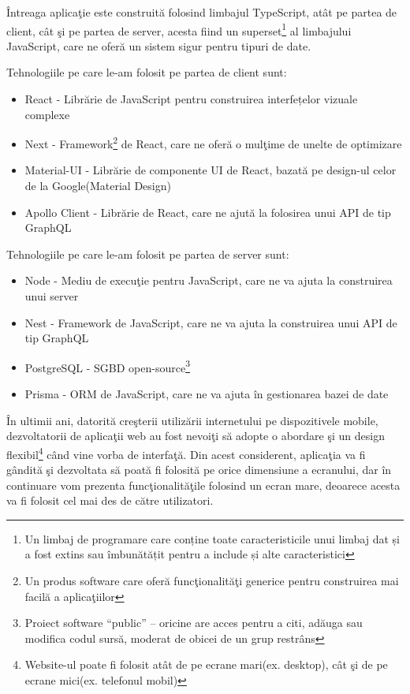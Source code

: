 \documentclass[12pt, a4paper, oneside, romanian]{teza-upb}
\begin{document}
Întreaga aplicaţie este construită folosind limbajul TypeScript, atât pe partea de client, cât şi pe partea de server, acesta fiind un superset\footnote{Un limbaj de programare care conține toate caracteristicile unui limbaj dat și a fost extins sau îmbunătățit pentru a include și alte caracteristici} al limbajului JavaScript, care ne oferă un sistem sigur pentru tipuri de date.

Tehnologiile pe care le-am folosit pe partea de client sunt:
\begin{itemize}
	\item React - Librărie de JavaScript pentru construirea interfețelor vizuale complexe
	\item Next - Framework\footnote{Un produs software care oferă funcţionalităţi generice pentru construirea mai facilă a aplicaţiilor} de React, care ne oferă o mulţime de unelte de optimizare
	\item Material-UI - Librărie de componente UI de React, bazată pe design-ul celor de la Google(Material Design)
	\item Apollo Client - Librărie de React, care ne ajută la folosirea unui API de tip GraphQL
\end{itemize}

Tehnologiile pe care le-am folosit pe partea de server sunt:
\begin{itemize}
	\item Node - Mediu de execuţie pentru JavaScript, care ne va ajuta la construirea unui server
	\item Nest - Framework de JavaScript, care ne va ajuta la construirea unui API de tip GraphQL
	\item PostgreSQL - SGBD open-source\footnote{Proiect software ``public'' -- oricine are acces pentru a citi, adăuga sau modifica codul sursă, moderat de obicei de un grup restrâns}
	\item Prisma - ORM de JavaScript, care ne va ajuta în gestionarea bazei de date
\end{itemize}

În ultimii ani, datorită creşterii utilizării internetului pe dispozitivele mobile, dezvoltatorii de aplicaţii web au fost nevoiţi să adopte o abordare şi un design flexibil\footnote{Website-ul poate fi folosit atât de pe ecrane mari(ex. desktop), cât şi de pe ecrane mici(ex. telefonul mobil)} când vine vorba de interfaţă. Din acest considerent, aplicaţia va fi gândită şi dezvoltata să poată fi folosită pe orice dimensiune a ecranului, dar în continuare vom prezenta funcţionalităţile folosind un ecran mare, deoarece acesta va fi folosit cel mai des de către utilizatori.
\end{document}
